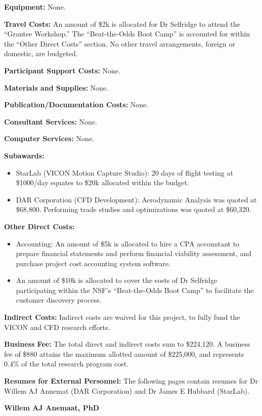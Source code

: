 \documentclass[11pt]{article}
\begin{document}
{\bf Equipment:} None.


{\bf Travel Costs:} An amount of \$2k is allocated for Dr Selfridge to attend the ``Grantee Workshop.''  The ``Beat-the-Odds Boot Camp'' is accounted for within the ``Other Direct Costs'' section.  No other travel arrangements, foreign or domestic, are budgeted.


{\bf Participant Support Costs:} None.


{\bf Materials and Supplies:} None.


{\bf Publication/Documentation Costs:} None.


{\bf Consultant Services:} None.


{\bf Computer Services:} None.


{\bf Subawards:}
\begin{itemize}
\item StarLab (VICON Motion Capture Studio): 20 days of flight testing at \$1000/day equates to \$20k allocated within the budget.
\item DAR Corporation (CFD Development): Aerodynamic Analysis was quoted at \$68,800.  Performing trade studies and optimizations was quoted at \$60,320.
\end{itemize}


{\bf Other Direct Costs:}
\begin{itemize}
\item Accounting: An amount of \$5k is allocated to hire a CPA accountant to prepare financial statements and perform financial viability assessment, and purchase project cost accounting system software.
\item An amount of \$10k is allocated to cover the costs of Dr Selfridge participating within the NSF's ``Beat-the-Odds Boot Camp'' to facilitate the customer discovery process.
\end{itemize}


{\bf Indirect Costs:} Indirect costs are waived for this project, to fully fund the VICON and CFD research efforts.


{\bf Business Fee:} The total direct and indirect costs sum to \$224,120.  A business fee of \$880 attains the maximum allotted amount of \$225,000, and represents 0.4\% of the total research program cost.


{\bf Resumes for External Personnel:} The following pages contain resumes for Dr Willem AJ Annemat (DAR Corporation) and Dr James E Hubbard (StarLab).




\newpage
{\bf \Large Willem AJ Anemaat, PhD}
\end{document}
